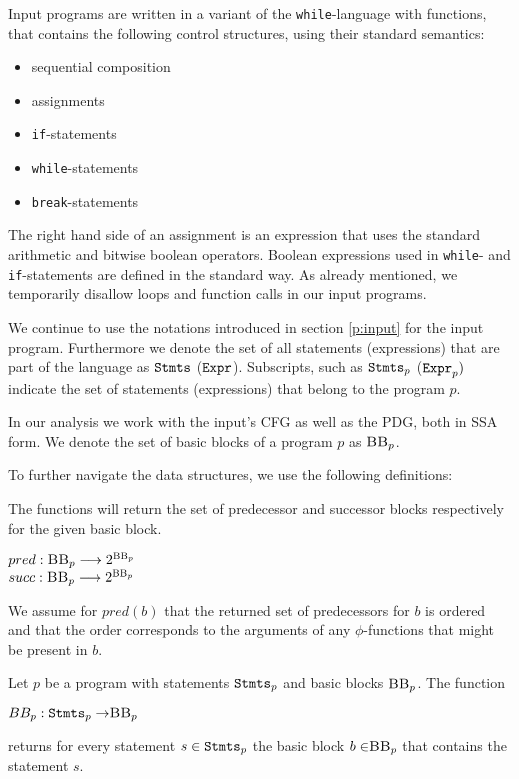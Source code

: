Input programs are written in a variant of the \texttt{while}-language with functions, that contains the following control structures, using their standard semantics:
\begin{itemize}
    \setlength\itemsep{0em}
    \item sequential composition
    \item assignments
    \item \texttt{if}-statements
    \item \texttt{while}-statements
    \item \texttt{break}-statements
\end{itemize}
The right hand side of an assignment is an expression that uses the standard arithmetic and bitwise boolean operators. Boolean expressions used in \texttt{while}- and \texttt{if}-statements are defined in the standard way. As already mentioned, we temporarily disallow loops and function calls in our input programs.

We continue to use the notations introduced in section \ref{p:input} for the input program. Furthermore we denote the set of all statements (expressions) that are part of the language as $\mathtt{Stmts}$ ($\mathtt{Expr}$). Subscripts, such as $\mathtt{Stmts}_p$ ($\mathtt{Expr}_p)$ indicate the set of statements (expressions) that belong to the program $p$.

In our analysis we work with the input's CFG as well as the PDG, both in SSA form. We denote the set of basic blocks of a program $p$ as $\mbb_p$.

To further navigate the data structures, we use the following definitions:

\begin{definition}\label{def:succPred}
    The functions will return the set of predecessor and successor blocks respectively for the given basic block.
    \begin{center}
        $pred: \textsc{BB}_p \longrightarrow 2^{\textsc{BB}_p}$\\
        $succ: \textsc{BB}_p \longrightarrow 2^{\textsc{BB}_p}$
    \end{center}
    We assume for $pred(b)$ that the returned set of predecessors for $b$ is ordered and that the order corresponds to the arguments of any $\phi$-functions that might be present in $b$.
\end{definition}

\begin{definition}
    Let $p$ be a program with statements $\mathtt{Stmts}_p$ and basic blocks $\mbb_p$. The function
    \begin{center}
        $BB_p: \stmts_p \to \mbb_p$
    \end{center}
    returns for every statement $s \in \mathtt{Stmts}_p$ the basic block $b \in \mbb_p$ that contains the statement $s$.
\end{definition}

